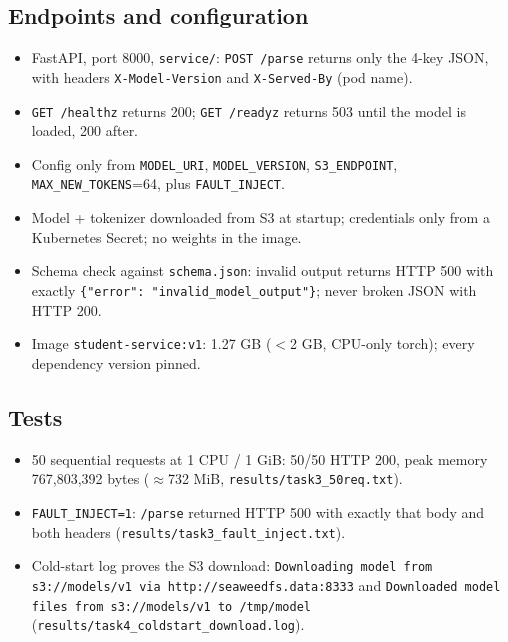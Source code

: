 \documentclass[11pt,a4paper]{article}
\begin{document}
\subsection*{Endpoints and configuration}
\begin{itemize}
\item FastAPI, port 8000, \texttt{service/}: \texttt{POST /parse} returns only the 4-key JSON, with headers \texttt{X-Model-Version} and \texttt{X-Served-By} (pod name).
\item \texttt{GET /healthz} returns 200; \texttt{GET /readyz} returns 503 until the model is loaded, 200 after.
\item Config only from \texttt{MODEL\_URI}, \texttt{MODEL\_VERSION}, \texttt{S3\_ENDPOINT}, \texttt{MAX\_NEW\_TOKENS}=64, plus \texttt{FAULT\_INJECT}.
\item Model + tokenizer downloaded from S3 at startup; credentials only from a Kubernetes Secret; no weights in the image.
\item Schema check against \texttt{schema.json}: invalid output returns HTTP 500 with exactly \texttt{\{"error": "invalid\_model\_output"\}}; never broken JSON with HTTP 200.
\item Image \texttt{student-service:v1}: 1.27 GB ($<$2 GB, CPU-only torch); every dependency version pinned.
\end{itemize}
\subsection*{Tests}
\begin{itemize}
\item 50 sequential requests at 1 CPU / 1 GiB: 50/50 HTTP 200, peak memory 767,803,392 bytes ($\approx$732 MiB, \texttt{results/task3\_50req.txt}).
\item \texttt{FAULT\_INJECT=1}: \texttt{/parse} returned HTTP 500 with exactly that body and both headers (\texttt{results/task3\_fault\_inject.txt}).
\item Cold-start log proves the S3 download: \texttt{Downloading model from s3://models/v1 via http://seaweedfs.data:8333} and \texttt{Downloaded model files from s3://models/v1 to /tmp/model} (\texttt{results/task4\_coldstart\_download.log}).
\end{itemize}
\end{document}
